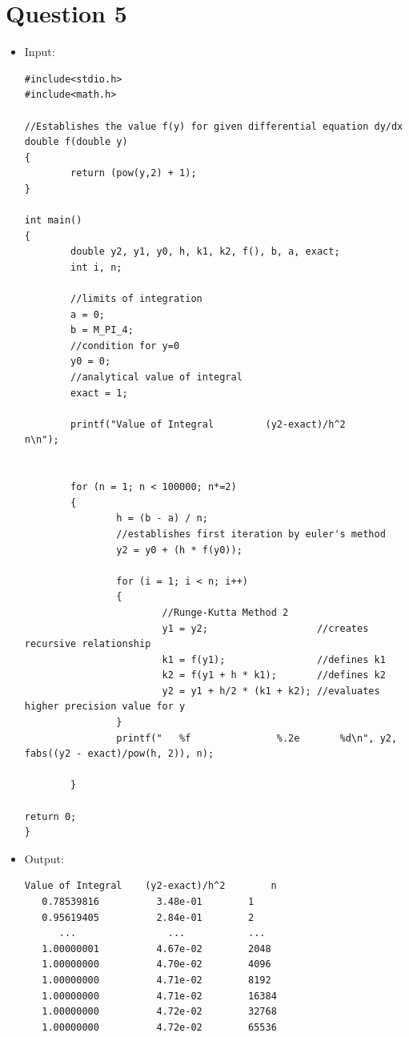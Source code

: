 \documentclass[10pt]{article}
\begin{document}
\section{Question 5}
\begin{itemize}
\item Input:
\begin{verbatim}
#include<stdio.h>
#include<math.h>

//Establishes the value f(y) for given differential equation dy/dx
double f(double y)
{
        return (pow(y,2) + 1);
}

int main()
{
        double y2, y1, y0, h, k1, k2, f(), b, a, exact;
        int i, n;
        
        //limits of integration
        a = 0;
        b = M_PI_4;
        //condition for y=0
        y0 = 0;
        //analytical value of integral
        exact = 1;

        printf("Value of Integral         (y2-exact)/h^2        n\n");


        for (n = 1; n < 100000; n*=2)
        {
                h = (b - a) / n;
                //establishes first iteration by euler's method
                y2 = y0 + (h * f(y0));
                
                for (i = 1; i < n; i++)
                {
                        //Runge-Kutta Method 2
                        y1 = y2;	               //creates recursive relationship
                        k1 = f(y1);				   //defines k1
                        k2 = f(y1 + h * k1);	   //defines k2
                        y2 = y1 + h/2 * (k1 + k2); //evaluates higher precision value for y
                }
                printf("   %f               %.2e       %d\n", y2, fabs((y2 - exact)/pow(h, 2)), n);
                
        }

return 0;
}
\end{verbatim}
\item Output:
\begin{verbatim}
Value of Integral    (y2-exact)/h^2        n
   0.78539816          3.48e-01        1
   0.95619405          2.84e-01        2
      ...                ...           ...
   1.00000001          4.67e-02        2048
   1.00000000          4.70e-02        4096
   1.00000000          4.71e-02        8192
   1.00000000          4.71e-02        16384
   1.00000000          4.72e-02        32768
   1.00000000          4.72e-02        65536

\end{verbatim}

\end{itemize}
\end{document}
